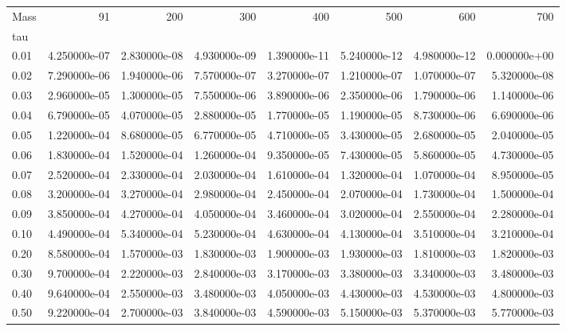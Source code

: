 \begin{tabular}{lrrrrrrr}
\toprule
Mass &           91  &           200 &           300 &           400 &           500 &           600 &           700 \\
tau   &               &               &               &               &               &               &               \\
\midrule
0.01  &  4.250000e-07 &  2.830000e-08 &  4.930000e-09 &  1.390000e-11 &  5.240000e-12 &  4.980000e-12 &  0.000000e+00 \\
0.02  &  7.290000e-06 &  1.940000e-06 &  7.570000e-07 &  3.270000e-07 &  1.210000e-07 &  1.070000e-07 &  5.320000e-08 \\
0.03  &  2.960000e-05 &  1.300000e-05 &  7.550000e-06 &  3.890000e-06 &  2.350000e-06 &  1.790000e-06 &  1.140000e-06 \\
0.04  &  6.790000e-05 &  4.070000e-05 &  2.880000e-05 &  1.770000e-05 &  1.190000e-05 &  8.730000e-06 &  6.690000e-06 \\
0.05  &  1.220000e-04 &  8.680000e-05 &  6.770000e-05 &  4.710000e-05 &  3.430000e-05 &  2.680000e-05 &  2.040000e-05 \\
0.06  &  1.830000e-04 &  1.520000e-04 &  1.260000e-04 &  9.350000e-05 &  7.430000e-05 &  5.860000e-05 &  4.730000e-05 \\
0.07  &  2.520000e-04 &  2.330000e-04 &  2.030000e-04 &  1.610000e-04 &  1.320000e-04 &  1.070000e-04 &  8.950000e-05 \\
0.08  &  3.200000e-04 &  3.270000e-04 &  2.980000e-04 &  2.450000e-04 &  2.070000e-04 &  1.730000e-04 &  1.500000e-04 \\
0.09  &  3.850000e-04 &  4.270000e-04 &  4.050000e-04 &  3.460000e-04 &  3.020000e-04 &  2.550000e-04 &  2.280000e-04 \\
0.10  &  4.490000e-04 &  5.340000e-04 &  5.230000e-04 &  4.630000e-04 &  4.130000e-04 &  3.510000e-04 &  3.210000e-04 \\
0.20  &  8.580000e-04 &  1.570000e-03 &  1.830000e-03 &  1.900000e-03 &  1.930000e-03 &  1.810000e-03 &  1.820000e-03 \\
0.30  &  9.700000e-04 &  2.220000e-03 &  2.840000e-03 &  3.170000e-03 &  3.380000e-03 &  3.340000e-03 &  3.480000e-03 \\
0.40  &  9.640000e-04 &  2.550000e-03 &  3.480000e-03 &  4.050000e-03 &  4.430000e-03 &  4.530000e-03 &  4.800000e-03 \\
0.50  &  9.220000e-04 &  2.700000e-03 &  3.840000e-03 &  4.590000e-03 &  5.150000e-03 &  5.370000e-03 &  5.770000e-03 \\

\end{tabular}
